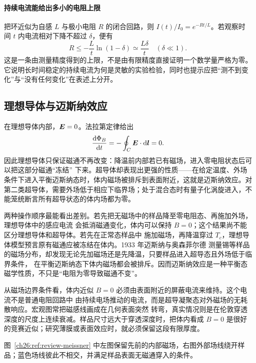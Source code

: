 {%
\paragraph{持续电流能给出多小的电阻上限}
把环近似为自感 $L$ 与极小电阻 $R$ 的闭合回路，则 $I(t)/I_0=e^{-Rt/L}$。若观察时间 $t$ 内电流相对下降不超过 $\delta$，便有
\[
 R\le-\frac Lt\ln(1-\delta)\simeq\frac{L\delta}{t}\quad(\delta\ll1).
\]
这是一条由测量精度得到的上限，不是由有限精度直接证明一个数学量严格为零。它说明长时间稳定的持续电流为何是灵敏的实验检验，同时也提示应把“测不到变化”与“没有任何变化”在表述上分开。


\subsection{理想导体与迈斯纳效应}


在理想导体内部，$\bm{E}=0$。法拉第定律给出
\begin{equation}
  \frac{\mathop{}\!\mathrm d\Phi_B}{\mathop{}\!\mathrm d t}=-\oint_C\bm{E}\cdot\mathop{}\!\mathrm d\bm{l}=0.
\end{equation}
因此理想导体只保证磁通不再改变：降温前内部若已有磁场，进入零电阻状态后可以把这部分磁通“冻结”
下来。超导体却表现出更强的性质——在给定温度、外场条件下进入平衡迈斯纳态时，体内磁场被排斥到表面附近，这就是迈斯纳效应。对第二类超导体，需要外场低于相应下临界场；处于混合态时有量子化涡旋进入，不能笼统断言所有超导状态的体内场都为零。

两种操作顺序最能看出差别。若先把无磁场中的样品降至零电阻态、再施加外场，理想导体中的感应电流
会抵消磁通变化，体内可以保持 $B=0$；这个结果尚不能区分理想导体和超导体。若先在正常态样品中
施加磁场，再降温穿过 $T_c$，理想导体模型预言原有磁通应被冻结在体内。1933 年迈斯纳与奥森菲尔德
测量锡等样品的磁场分布，却发现无论先加磁场还是先降温，只要样品进入超导态且外场低于临界条件，
在平衡迈斯纳态下体内磁场都会被排斥。因而迈斯纳效应是一种平衡态磁学性质，不只是“电阻为零导致磁通不变”。

从磁场边界条件看，体内近似 $B=0$ 必须由表面附近的屏蔽电流来维持。这个电流不是普通电阻回路中
由持续电场推动的电流，而是超导凝聚态对外磁场的无耗散响应。宏观图常把磁感线画成在几何表面突然
转弯，真实情况则是在伦敦穿透深度的尺度上连续衰减。样品尺寸远大于穿透深度时，把体内看成
$B=0$ 是很好的竞赛近似；研究薄膜或表面效应时，就必须保留这段有限厚度。

图~\ref{ch26:ref:review-meissner} 中左图保留先前的内部磁场，右图外部场线绕开样品；蓝色场线彼此不相交，并满足样品表面无磁通穿入的条件。

\meissnerComparisonDiagram

}
